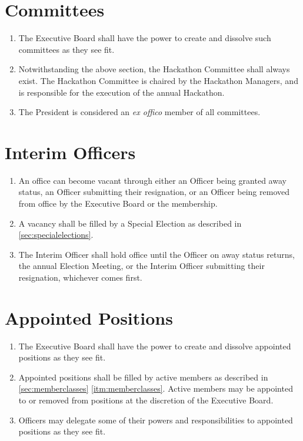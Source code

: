 \documentclass[12pt, letterpaper, oneside]{book}
\begin{document}
\section{Committees}
\begin{enumerate}
    \item The Executive Board shall have the power to create and dissolve such
        committees as they see fit.
    \item Notwithstanding the above section, the Hackathon Committee shall always
        exist. The Hackathon Committee is chaired by the Hackathon Managers, and
        is responsible for the execution of the annual Hackathon.
    \item The President is considered an \emph{ex offico} member of all
        committees.
\end{enumerate}

\section{Interim Officers}
\begin{enumerate}
    \item An office can become vacant through either an Officer being granted
        away status, an Officer submitting their resignation, or an Officer
        being removed from office by the Executive Board or the membership.
    \item A vacancy shall be filled by a Special Election as described in
        \cref{sec:specialelections}.
    \item The Interim Officer shall hold office until the Officer on away status
        returns, the annual Election Meeting, or the Interim Officer submitting
        their resignation, whichever comes first.
\end{enumerate}

\section{Appointed Positions}
\begin{enumerate}
    \item The Executive Board shall have the power to create and dissolve
        appointed positions as they see fit.
    \item Appointed positions shall be filled by active members as described in
        \cref{sec:memberclasses} \cref{itm:memberclasses}. Active members may be
        appointed to or removed from positions at the discretion of the
        Executive Board.
    \item Officers may delegate some of their powers and responsibilities to
        appointed positions as they see fit.
\end{enumerate}
\end{document}
